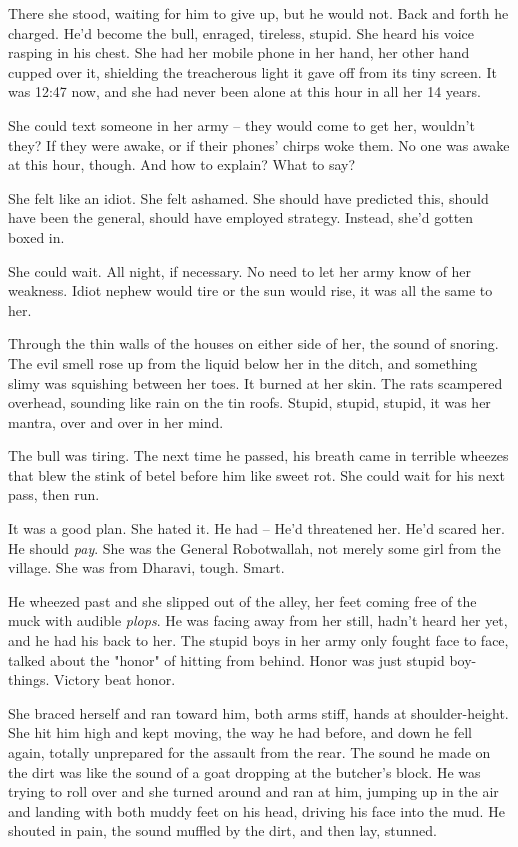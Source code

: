 There she stood, waiting for him to give up, but he would not. Back
and forth he charged. He'd become the bull, enraged, tireless,
stupid. She heard his voice rasping in his chest. She had her
mobile phone in her hand, her other hand cupped over it, shielding
the treacherous light it gave off from its tiny screen. It was
12:47 now, and she had never been alone at this hour in all her 14
years.

She could text someone in her army -- they would come to get her,
wouldn't they? If they were awake, or if their phones' chirps woke
them. No one was awake at this hour, though. And how to explain?
What to say?

She felt like an idiot. She felt ashamed. She should have predicted
this, should have been the general, should have employed strategy.
Instead, she'd gotten boxed in.

She could wait. All night, if necessary. No need to let her army
know of her weakness. Idiot nephew would tire or the sun would
rise, it was all the same to her.

Through the thin walls of the houses on either side of her, the
sound of snoring. The evil smell rose up from the liquid below her
in the ditch, and something slimy was squishing between her toes.
It burned at her skin. The rats scampered overhead, sounding like
rain on the tin roofs. Stupid, stupid, stupid, it was her mantra,
over and over in her mind.

The bull was tiring. The next time he passed, his breath came in
terrible wheezes that blew the stink of betel before him like sweet
rot. She could wait for his next pass, then run.

It was a good plan. She hated it. He had -- He'd threatened her.
He'd scared her. He should \emph{pay}. She was the General
Robotwallah, not merely some girl from the village. She was from
Dharavi, tough. Smart.

He wheezed past and she slipped out of the alley, her feet coming
free of the muck with audible \emph{plops}. He was facing away from
her still, hadn't heard her yet, and he had his back to her. The
stupid boys in her army only fought face to face, talked about the
"honor" of hitting from behind. Honor was just stupid boy-things.
Victory beat honor.

She braced herself and ran toward him, both arms stiff, hands at
shoulder-height. She hit him high and kept moving, the way he had
before, and down he fell again, totally unprepared for the assault
from the rear. The sound he made on the dirt was like the sound of
a goat dropping at the butcher's block. He was trying to roll over
and she turned around and ran at him, jumping up in the air and
landing with both muddy feet on his head, driving his face into the
mud. He shouted in pain, the sound muffled by the dirt, and then
lay, stunned.

